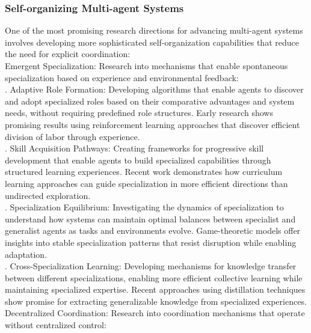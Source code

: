 \subsubsection{Self-organizing Multi-agent Systems}
One of the most promising research directions for advancing multi-agent systems involves developing more sophisticated self-organization capabilities that reduce the need for explicit coordination:\\ \newline
Emergent Specialization: Research into mechanisms that enable spontaneous specialization based on experience and environmental feedback:\\ . Adaptive Role Formation: Developing algorithms that enable agents to discover and adopt specialized roles based on their comparative advantages and system needs, without requiring predefined role structures. Early research shows promising results using reinforcement learning approaches that discover efficient division of labor through experience.\\ . Skill Acquisition Pathways: Creating frameworks for progressive skill development that enable agents to build specialized capabilities through structured learning experiences. Recent work demonstrates how curriculum learning approaches can guide specialization in more efficient directions than undirected exploration.\\ . Specialization Equilibrium: Investigating the dynamics of specialization to understand how systems can maintain optimal balances between specialist and generalist agents as tasks and environments evolve. Game-theoretic models offer insights into stable specialization patterns that resist disruption while enabling adaptation.\\ . Cross-Specialization Learning: Developing mechanisms for knowledge transfer between different specializations, enabling more efficient collective learning while maintaining specialized expertise. Recent approaches using distillation techniques show promise for extracting generalizable knowledge from specialized experiences.\\ \newline
Decentralized Coordination: Research into coordination mechanisms that operate without centralized control:\\ \newline
